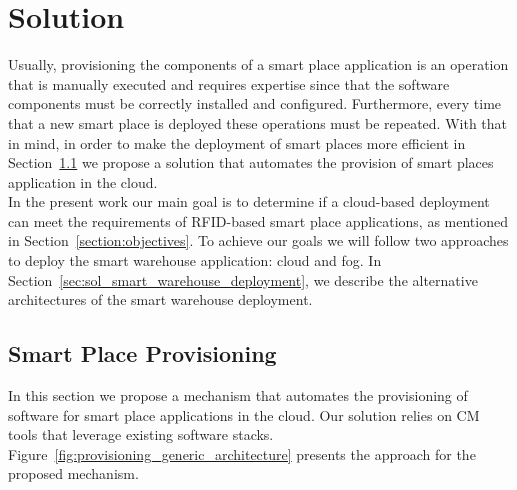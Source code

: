 
\chapter{Solution}
\label{chapter:solution}
Usually, provisioning the components of a smart place application is an operation
that is manually executed and requires expertise since that the software components must
be correctly installed and configured. Furthermore, every time that a new smart place is deployed
these operations must be repeated. With that in mind, in order to make the deployment of
smart places more efficient in Section~\ref{sec:sol_provisioning} we propose a solution
that automates the provision of smart places application in the cloud.\\

In the present work our main goal is to determine if a cloud-based deployment can meet the
requirements of RFID-based smart place applications, as mentioned in Section~\ref{section:objectives}.
To achieve our goals we will follow two approaches to deploy the smart warehouse application: cloud
and fog. In Section~\ref{sec:sol_smart_warehouse_deployment}, we describe the alternative
architectures of the smart warehouse deployment.\\

\section{Smart Place Provisioning}
\label{sec:sol_provisioning}
In this section we propose a mechanism that automates the provisioning of software for smart place
applications in the cloud. Our solution relies on \acrfull{CM} tools that leverage
existing software stacks. Figure~\ref{fig:provisioning_generic_architecture} presents the approach
for the proposed mechanism.\\

